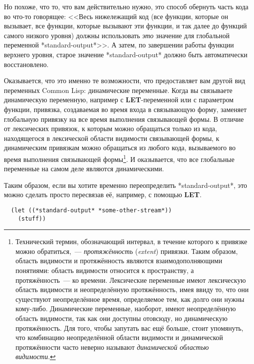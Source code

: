 Но похоже, что то, что вам действительно нужно, это способ обернуть часть кода во что-то
говорящее: <<Весь нижележащий код (все функции, которые он вызывает, все функции, которые
вызывают эти функции, и так далее до функций самого низкого уровня) должны использовать
\textit{это} значение для глобальной переменной *standard-output*>>. А затем, по завершении
работы функции верхнего уровня, старое значение *standard-output* должно быть
автоматически восстановлено.

Оказывается, что это именно те возможности, что предоставляет вам другой вид переменных
Common Lisp: динамические переменные. Когда вы связываете динамическую переменную,
например с \textbf{LET}-переменной или с параметром функции, привязка, создаваемая во
время входа в связывающую форму, заменяет глобальную привязку на все время выполнения
связывающей формы. В отличие от лексических привязок, к которым можно обращаться только из
кода, находящегося в лексической области видимости связывающей формы, к динамическим
привязкам можно обращаться из любого кода, вызываемого во время выполнения связывающей
формы\footnote{Технический термин, обозначающий интервал, в течение которого к привязке
  можно обратиться,~--- \textit{протяжённость} (\textit{extent}) привязки. Таким образом,
  область видимости и протяжённость являются взаимодополняющими понятиями: область
  видимости относится к пространству, а протяжённость~--- ко времени. Лексические
  переменные имеют лексическую область видимости и неопределённую протяжённость, имея
  ввиду то, что они существуют неопределённое время, определяемое тем, как долго они нужны
  кому-либо. Динамические переменные, наоборот, имеют неопределённую область видимости,
  так как они доступны отовсюду, но динамическую протяжённость. Для того, чтобы запутать
  вас ещё больше, стоит упомянуть, что комбинацию неопределённой области видимости и
  динамической протяжённости часто неверно называют \textit{динамической областью
    видимости}.}. И оказывается, что все глобальные переменные на самом деле являются
динамическими.

Таким образом, если вы хотите временно переопределить *standard-output*, это можно сделать
просто пересвязав её, например, с помощью \textbf{LET}.

\begin{lstlisting}
  (let ((*standard-output* *some-other-stream*))
    (stuff))
\end{lstlisting}

